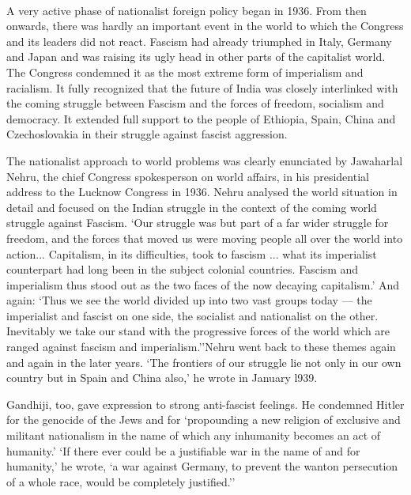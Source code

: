 \paragraph*{}


A very active phase of nationalist foreign policy began in 1936. From then onwards, there was hardly an important event in the world to which the Congress and its leaders did not react. Fascism had already triumphed in Italy, Germany and Japan and was raising its ugly head in other parts of the capitalist world. The Congress condemned it as the most extreme form of imperialism and racialism. It fully recognized that the future of India was closely interlinked with the coming struggle between Fascism and the forces of freedom, socialism and democracy. It extended full support to the people of Ethiopia, Spain, China and Czechoslovakia in their struggle against fascist aggression. 

The nationalist approach to world problems was clearly enunciated by Jawaharlal Nehru, the chief Congress spokesperson on world affairs, in his presidential address to the Lucknow Congress in 1936. Nehru analysed the world situation in detail and focused on the Indian struggle in the context of the coming world struggle against Fascism. `Our struggle was but part of a far wider struggle for freedom, and the forces that moved us were moving people all over the world into action... Capitalism, in its difficulties, took to fascism ... what its imperialist counterpart had long been in the subject colonial countries. Fascism and imperialism thus stood out as the two faces of the now decaying capitalism.' And again: `Thus we see the world divided up into two vast groups today — the imperialist and fascist on one side, the socialist and nationalist on the other. Inevitably we take our stand with the progressive forces of the world which are ranged against fascism and imperialism.''Nehru went back to these themes again and again in the later years. `The frontiers of our struggle lie not only in our own country but in Spain and China also,' he wrote in January l939. 

Gandhiji, too, gave expression to strong anti-fascist feelings. He condemned Hitler for the genocide of the Jews and for `propounding a new religion of exclusive and militant nationalism in the name of which any inhumanity becomes an act of humanity.' `If there ever could be a justifiable war in the name of and for humanity,' he wrote, `a war against Germany, to prevent the wanton persecution of a whole race, would be completely justified.'' 

